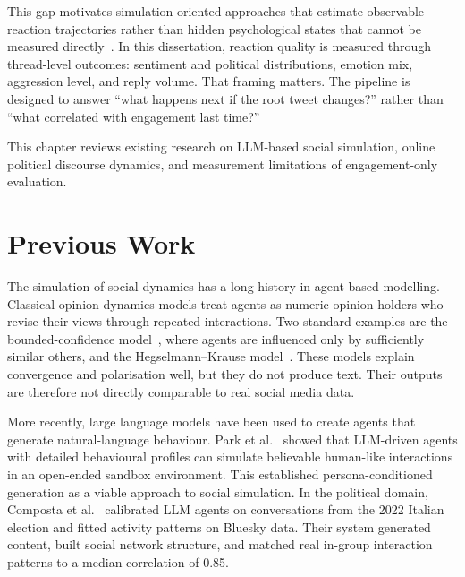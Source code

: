\documentclass[logo,bsc,singlespacing,parskip,online]{infthesis}
\begin{document}
This gap motivates simulation-oriented approaches that estimate observable reaction trajectories rather than hidden psychological states that cannot be measured directly~\citep{butler2024misinformation,composta2025simulating}. In this dissertation, reaction quality is measured through thread-level outcomes: sentiment and political distributions, emotion mix, aggression level, and reply volume. That framing matters. The pipeline is designed to answer ``what happens next if the root tweet changes?'' rather than ``what correlated with engagement last time?''

This chapter reviews existing research on LLM-based social simulation, online political discourse dynamics, and measurement limitations of engagement-only evaluation.

\section{Previous Work}

The simulation of social dynamics has a long history in agent-based modelling. Classical opinion-dynamics models treat agents as numeric opinion holders who revise their views through repeated interactions. Two standard examples are the bounded-confidence model~\citep{deffuant2000mixing}, where agents are influenced only by sufficiently similar others, and the Hegselmann--Krause model~\citep{hegselmann2002opinion}. These models explain convergence and polarisation well, but they do not produce text. Their outputs are therefore not directly comparable to real social media data.

More recently, large language models have been used to create agents that generate natural-language behaviour. Park et al.~\citep{park2023generative} showed that LLM-driven agents with detailed behavioural profiles can simulate believable human-like interactions in an open-ended sandbox environment. This established persona-conditioned generation as a viable approach to social simulation. In the political domain, Composta et al.~\citep{composta2025simulating} calibrated LLM agents on conversations from the 2022 Italian election and fitted activity patterns on Bluesky data. Their system generated content, built social network structure, and matched real in-group interaction patterns to a median correlation of 0.85.
\end{document}
